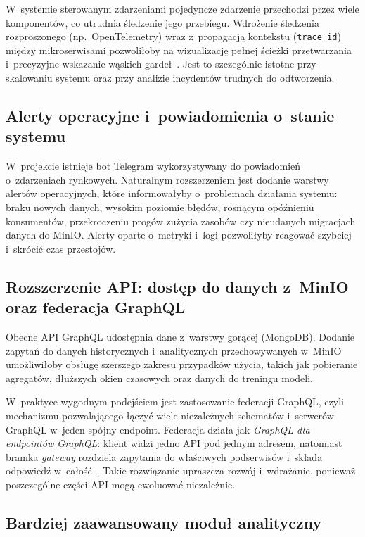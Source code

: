 W~systemie sterowanym zdarzeniami pojedyncze zdarzenie przechodzi przez wiele komponentów, co utrudnia śledzenie jego
przebiegu.
Wdrożenie śledzenia rozproszonego (np.\ OpenTelemetry) wraz z~propagacją kontekstu (\texttt{trace\_id}) między
mikroserwisami pozwoliłoby na wizualizację pełnej ścieżki przetwarzania i~precyzyjne wskazanie wąskich gardeł~\cite{open_telemetry}.
Jest to szczególnie istotne przy skalowaniu systemu oraz przy analizie incydentów trudnych do odtworzenia.

\subsection[Alerty operacyjne i powiadomienia o stanie systemu]{Alerty operacyjne i~powiadomienia o~stanie systemu}

W~projekcie istnieje bot Telegram wykorzystywany do powiadomień o~zdarzeniach rynkowych.
Naturalnym rozszerzeniem jest dodanie warstwy alertów operacyjnych, które informowałyby o~problemach działania
systemu: braku nowych danych, wysokim poziomie błędów, rosnącym opóźnieniu konsumentów, przekroczeniu progów
zużycia zasobów czy nieudanych migracjach danych do MinIO\@.
Alerty oparte o~metryki i~logi pozwoliłyby reagować szybciej i~skrócić czas przestojów.

\subsection[Rozszerzenie API: dostęp do danych z MinIO oraz federacja GraphQL]{Rozszerzenie API: dostęp do danych z~MinIO oraz federacja GraphQL}

Obecne API GraphQL udostępnia dane z~warstwy gorącej (MongoDB).
Dodanie zapytań do danych historycznych i~analitycznych przechowywanych w~MinIO umożliwiłoby obsługę szerszego
zakresu przypadków użycia, takich jak pobieranie agregatów, dłuższych okien czasowych oraz danych do treningu
modeli.

W~praktyce wygodnym podejściem jest zastosowanie federacji GraphQL, czyli mechanizmu pozwalającego łączyć wiele
niezależnych schematów i~serwerów GraphQL w~jeden spójny endpoint.
Federacja działa jak \textit{GraphQL dla endpointów GraphQL}: klient widzi jedno API pod jednym adresem, natomiast bramka
\textit{gateway} rozdziela zapytania do właściwych podserwisów i~składa odpowiedź w~całość~\cite{apollo_federation_architecture}.
Takie rozwiązanie upraszcza rozwój i~wdrażanie, ponieważ poszczególne części API mogą ewoluować niezależnie.

\subsection{Bardziej zaawansowany moduł analityczny}

